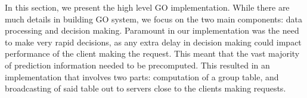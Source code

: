 \label{sec:impl}

In this section, we present the high level GO implementation. While there are much details in building GO system, we focus on the two main components: data processing and decision making. Paramount in our implementation was the need to make very rapid decisions, as any extra delay in decision making could impact performance of the client making the request. This meant that the vast majority of prediction information needed to be precomputed. This resulted in an implementation that involves two parts: computation of a group table, and broadcasting of said table out to servers close to the clients making requests.



